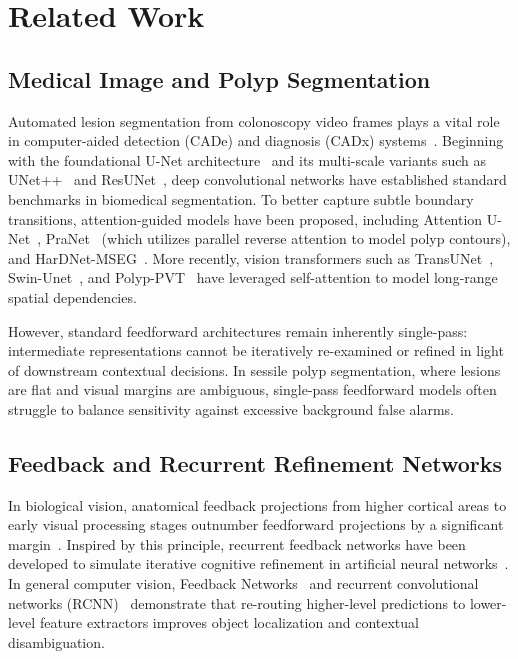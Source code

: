 \section{Related Work}
\label{sec:related}

\subsection{Medical Image and Polyp Segmentation}
Automated lesion segmentation from colonoscopy video frames plays a vital
role in computer-aided detection (CADe) and diagnosis (CADx)
systems~\cite{siegel2023colorectal, leufkens2012factors}. Beginning with
the foundational U-Net architecture~\cite{ronneberger2015unet} and its
multi-scale variants such as UNet++~\cite{zhou2018unetplusplus} and
ResUNet~\cite{zhang2018road}, deep convolutional networks have established
standard benchmarks in biomedical segmentation. To better capture subtle
boundary transitions, attention-guided models have been proposed, including
Attention U-Net~\cite{oktay2018attention}, PraNet~\cite{fan2020pranet}
(which utilizes parallel reverse attention to model polyp contours), and
HarDNet-MSEG~\cite{huang2021hardnet}. More recently, vision transformers
such as TransUNet~\cite{chen2021transunet}, Swin-Unet~\cite{cao2022swin},
and Polyp-PVT~\cite{dong2021polyp} have leveraged self-attention to model
long-range spatial dependencies.

However, standard feedforward architectures remain inherently single-pass:
intermediate representations cannot be iteratively re-examined or refined
in light of downstream contextual decisions. In sessile polyp segmentation,
where lesions are flat and visual margins are ambiguous, single-pass
feedforward models often struggle to balance sensitivity against excessive
background false alarms.

\subsection{Feedback and Recurrent Refinement Networks}
In biological vision, anatomical feedback projections from higher cortical
areas to early visual processing stages outnumber feedforward projections
by a significant margin~\cite{felleman1991distributed, gilbert2013top}.
Inspired by this principle, recurrent feedback networks have been developed
to simulate iterative cognitive refinement in artificial neural
networks~\cite{liang2015recurrent, zamir2017feedback}. In general computer
vision, Feedback Networks~\cite{zamir2017feedback} and recurrent
convolutional networks (RCNN)~\cite{pinheiro2014recurrent} demonstrate that
re-routing higher-level predictions to lower-level feature extractors
improves object localization and contextual disambiguation.

